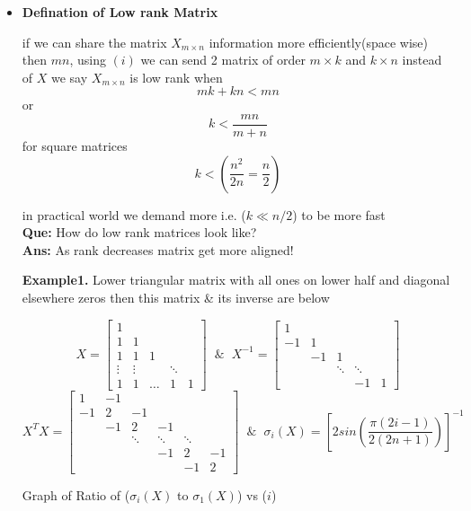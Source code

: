 \documentclass[a4paper]{article}
\numberwithin{equation}{section}
\begin{document}
\begin{itemize}
\item \textbf{Defination of Low rank Matrix}

if we can share the matrix $X_{m\times n}$  information more efficiently(space wise) then $mn$, using $(i)$ we can send 2 matrix of order $m\times k$ and $k\times n$ instead of $X$ we say $X_{m\times n}$ is low rank when 
\[mk+kn<mn\]
or \[\boxed{k<\frac{mn}{m+n}}\]
for square matrices
\[k<\left(\frac{n^2}{2n}=\frac{n}{2}\right)\]

in practical world we demand more i.e. ($k\ll n/2$) to be more fast\\

\textbf{Que: }How do low rank matrices look like?\\
\textbf{Ans: }As rank decreases matrix get more aligned!

\textbf{Example1.} Lower triangular matrix with all ones on lower half and diagonal elsewhere zeros then this matrix \& its inverse are below

\[X=\begin{bmatrix}
    1&&&&\\
    1&1&&&\\
    1&1&1&&\\
    \vdots&\vdots&&\ddots&\\
    1&1&\dots&1&1
\end{bmatrix} \hspace{7pt}\& \hspace{7pt} X^{-1}=
\begin{bmatrix}
    1&&&&\\
    -1&1&&&\\
    &-1&1&&\\
    &&\ddots&\ddots&\\
    &&&-1&1
\end{bmatrix}
\]
\[X^TX=
\begin{bmatrix}
    1&-1&&&\\
    -1&2&-1&&\\
    &-1&2&-1&\\
    &&\ddots&\ddots&\ddots\\
    &&&-1&2&-1\\
    &&&&-1&2
\end{bmatrix}  \hspace{7pt}\& \hspace{7pt} \sigma_i(X)=\left[2sin\left(\frac{\pi(2i-1) }{2(2n+1)}\right)\right]^{-1}
\]

Graph of Ratio of ($\sigma_i(X)$ to $\sigma_1(X)$) vs ($i$)


\end{itemize}
\end{document}
